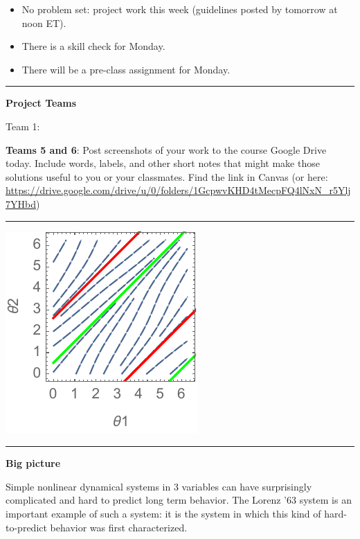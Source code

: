 \documentclass[12pt,letterpaper,noanswers]{exam}
\begin{document}
 \pdfpageheight 11in 
  \pdfpagewidth 8.5in

\noindent 




\begin{itemize}
\item No problem set: project work this week (guidelines posted by tomorrow at noon ET).
\item There is a skill check for Monday.
\item There will be a pre-class assignment for Monday.
\end{itemize}

\hrule
\vspace{0.2cm}



\noindent\textbf{Project Teams}

Team 1:


\noindent \textbf{Teams 5 and 6}: Post screenshots of your work to the course Google Drive today.  Include words, labels, and other short notes that might make those solutions useful to you or your classmates.  Find the link in Canvas (or here: \url{https://drive.google.com/drive/u/0/folders/1GcpwvKHD4tMecpFQ4lNxN_r5Ylj7YHbd})


\vspace{0.2cm}

\hrule
\vspace{0.2cm}

\includegraphics{img/C21thetaphaseportrait.pdf}

\vspace{0.2cm}

\hrule
\vspace{0.2cm}

\noindent\textbf{Big picture}

Simple nonlinear dynamical systems in 3 variables can have surprisingly complicated and hard to predict long term behavior.  The Lorenz '63 system is an important example of such a system: it is the system in which this kind of hard-to-predict behavior was first characterized.
\end{document}
